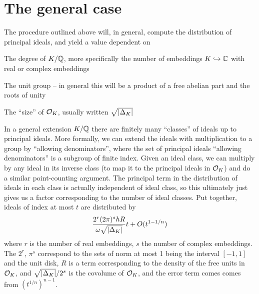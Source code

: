 \documentclass[11pt]{article}
\begin{document}
\section{The general case}
The procedure outlined above will, in general, compute the distribution of principal ideals, and yield a value dependent on
\begin{enum}
    \item The degree of $K / \mathbb{Q}$, more specifically the number of embeddings $K \hookrightarrow \mathbb{C}$ with real or complex embeddings
    \item The unit group -- in general this will be a product of a free abelian part and the roots of unity
    \item The ``size'' of $\mathcal{O}_K$, usually written $\sqrt{\left| \Delta_K \right|}$
\end{enum}
In a general extension $K / \mathbb{Q}$ there are finitely many ``classes'' of ideals up to principal ideals. More formally, we can extend the ideals with multiplication to a group by ``allowing denominators'', where the set of principal ideals ``allowing denominators'' is a subgroup of finite index. Given an ideal class, we can multiply by any ideal in its inverse class (to map it to the principal ideals in $\mathcal{O}_K$) and do a similar point-counting argument. The principal term in the distribution of ideals in each class is actually independent of ideal class, so this ultimately just gives us a factor corresponding to the number of ideal classes. Put together, ideals of index at most $t$ are distributed by
$$
    \frac{2^r(2\pi)^shR}{\omega \sqrt{\left| \Delta_K \right|}}t + O(t^{1 - 1/n})
$$
where $r$ is the number of real embeddings, $s$ the number of complex embeddings. The $2^r$, $\pi^s$ correspond to the sets of norm at most 1 being the interval $[-1, 1]$ and the unit disk, $R$ is a term corresponding to the density of the free units in $\mathcal{O}_K$, and $\sqrt{\left| \Delta_K \right|}/2^s$ is the covolume of $\mathcal{O}_K$, and the error term comes comes from $(t^{1/n})^{n - 1}$.
\end{document}
